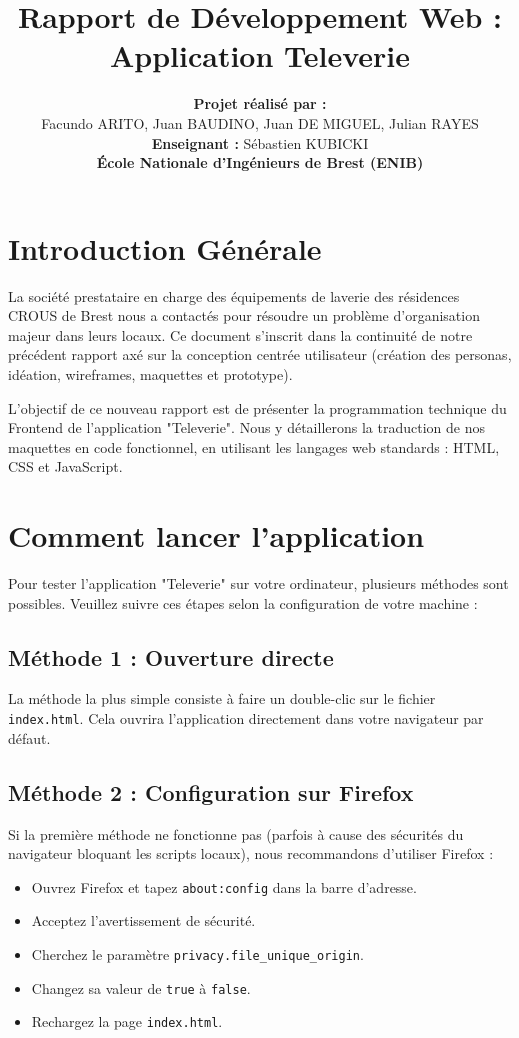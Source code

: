 \date{}\documentclass[12pt,a4paper]{article}
\title{\textbf{Rapport de Développement Web : Application Televerie}}
\author{
    \textbf{Projet réalisé par :} \\
    Facundo ARITO, Juan BAUDINO, Juan DE MIGUEL, Julian RAYES \\
    \textbf{Enseignant :} Sébastien KUBICKI \\
    \textbf{École Nationale d'Ingénieurs de Brest (ENIB)}
}
\date{}
\begin{document}
\maketitle
\thispagestyle{empty} %
\pagestyle{empty}     %

\section*{Introduction Générale}
La société prestataire en charge des équipements de laverie des résidences CROUS de Brest nous a contactés pour résoudre un problème d'organisation majeur dans leurs locaux. Ce document s'inscrit dans la continuité de notre précédent rapport axé sur la conception centrée utilisateur (création des personas, idéation, wireframes, maquettes et prototype). 

L'objectif de ce nouveau rapport est de présenter la programmation technique du Frontend de l'application "Televerie". Nous y détaillerons la traduction de nos maquettes en code fonctionnel, en utilisant les langages web standards : HTML, CSS et JavaScript.

\section*{Comment lancer l'application}
Pour tester l'application "Televerie" sur votre ordinateur, plusieurs méthodes sont possibles. Veuillez suivre ces étapes selon la configuration de votre machine :

\subsection*{Méthode 1 : Ouverture directe}
La méthode la plus simple consiste à faire un double-clic sur le fichier \texttt{index.html}. Cela ouvrira l'application directement dans votre navigateur par défaut.

\subsection*{Méthode 2 : Configuration sur Firefox}
Si la première méthode ne fonctionne pas (parfois à cause des sécurités du navigateur bloquant les scripts locaux), nous recommandons d'utiliser Firefox :
\begin{itemize}
    \item Ouvrez Firefox et tapez \texttt{about:config} dans la barre d'adresse.
    \item Acceptez l'avertissement de sécurité.
    \item Cherchez le paramètre \texttt{privacy.file\_unique\_origin}.
    \item Changez sa valeur de \texttt{true} à \texttt{false}.
    \item Rechargez la page \texttt{index.html}.
\end{itemize}
\end{document}
